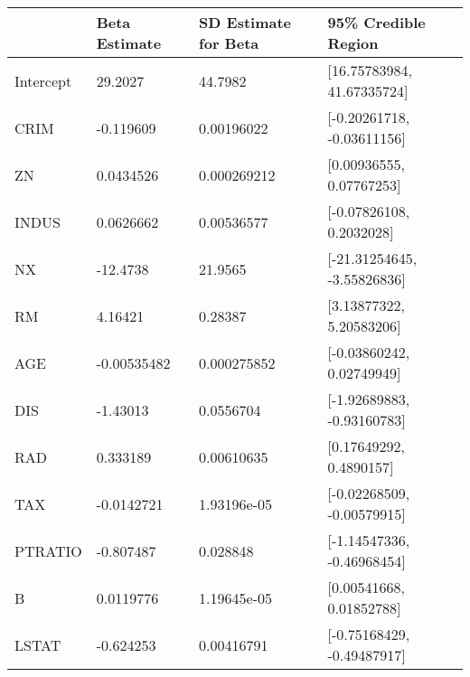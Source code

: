 \begin{tabular}{llll}
\hline
           & Beta Estimate   & SD Estimate for Beta   & 95\% Credible Region         \\
\hline
 Intercept & 29.2027         & 44.7982                & [16.75783984, 41.67335724]  \\
 CRIM      & -0.119609       & 0.00196022             & [-0.20261718, -0.03611156]  \\
 ZN        & 0.0434526       & 0.000269212            & [0.00936555, 0.07767253]    \\
 INDUS     & 0.0626662       & 0.00536577             & [-0.07826108, 0.2032028]    \\
 NX        & -12.4738        & 21.9565                & [-21.31254645, -3.55826836] \\
 RM        & 4.16421         & 0.28387                & [3.13877322, 5.20583206]    \\
 AGE       & -0.00535482     & 0.000275852            & [-0.03860242, 0.02749949]   \\
 DIS       & -1.43013        & 0.0556704              & [-1.92689883, -0.93160783]  \\
 RAD       & 0.333189        & 0.00610635             & [0.17649292, 0.4890157]     \\
 TAX       & -0.0142721      & 1.93196e-05            & [-0.02268509, -0.00579915]  \\
 PTRATIO   & -0.807487       & 0.028848               & [-1.14547336, -0.46968454]  \\
 B         & 0.0119776       & 1.19645e-05            & [0.00541668, 0.01852788]    \\
 LSTAT     & -0.624253       & 0.00416791             & [-0.75168429, -0.49487917]  \\
\hline
\end{tabular}